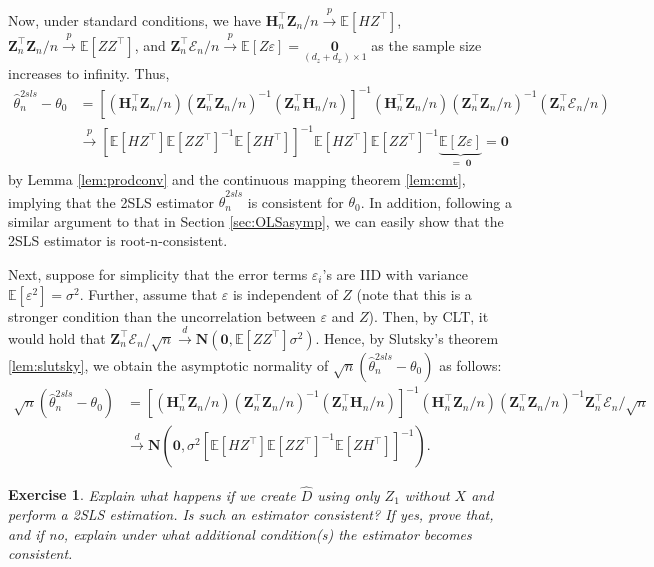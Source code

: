 \documentclass[10.5pt, A4paper, openany, uplatex]{book}
\newcommand{\mbf}{\mathbf}
\newcommand{\mcl}{\mathcal}
\newcommand{\eps}{\varepsilon}
\newcommand{\E}{\mathbb{E}}
\renewcommand{\hat}{\widehat}
\newtheorem{exercise}[theorem]{Exercise}
\numberwithin{equation}{section}
\begin{document}
Now, under standard conditions, we have $\mbf{H}_n^\top \mbf{Z}_n/n \overset{p}{\to} \E[H Z^\top]$,  $\mbf{Z}_n^\top \mbf{Z}_n/n \overset{p}{\to} \E[Z Z^\top]$, and  $\mbf{Z}_n^\top \mcl{E}_n/n \overset{p}{\to} \E[Z \eps] = \underset{(d_z + d_x)\times 1}{\mbf{0}}$ as the sample size increases to infinity.
Thus,
\begin{align*}	
	\hat\theta_n^{2sls} - \theta_0
	& = \left[(\mbf{H}_n^\top \mbf{Z}_n/n)(\mbf{Z}_n^\top \mbf{Z}_n/n)^{-1}(\mbf{Z}_n^\top \mbf{H}_n/n ) \right]^{-1}(\mbf{H}_n^\top \mbf{Z}_n/n)(\mbf{Z}_n^\top \mbf{Z}_n/n)^{-1}(\mbf{Z}_n^\top\mcl{E}_n/n) \\
	& \overset{p}{\to} \left[ \E[H Z^\top] \E[Z Z^\top]^{-1} \E[Z H^\top] \right]^{-1} \E[H Z^\top] \E[Z Z^\top]^{-1} \underbrace{\E[Z \eps]}_{= \; \mbf{0}} = \mbf{0}
\end{align*}
by Lemma \ref{lem:prodconv} and the continuous mapping theorem \ref{lem:cmt}, implying that the 2SLS estimator $\hat\theta_n^{2sls}$ is consistent for $\theta_0$.
In addition, following a similar argument to that in Section \ref{sec:OLSasymp}, we can easily show that the 2SLS estimator is root-n-consistent.

Next, suppose for simplicity that the error terms $\eps_i$'s are IID with variance $\E[\eps^2] = \sigma^2$.
Further, assume that $\eps$ is independent of $Z$ (note that this is a stronger condition than the uncorrelation between $\eps$ and $Z$).
Then, by CLT, it would hold that $\mbf{Z}_n^\top\mcl{E}_n/\sqrt{n} \overset{d}{\to} \mbf{N}(\mbf{0}, \E[Z Z^\top]\sigma^2)$.
Hence, by Slutsky's theorem \ref{lem:slutsky}, we obtain the asymptotic normality of $\sqrt{n}(\hat\theta_n^{2sls} - \theta_0)$ as follows:
\begin{align*}
	\sqrt{n}(\hat\theta_n^{2sls} - \theta_0) 
	& = \left[(\mbf{H}_n^\top \mbf{Z}_n/n)(\mbf{Z}_n^\top \mbf{Z}_n/n)^{-1}(\mbf{Z}_n^\top \mbf{H}_n/n ) \right]^{-1}(\mbf{H}_n^\top \mbf{Z}_n/n)(\mbf{Z}_n^\top \mbf{Z}_n/n)^{-1}\mbf{Z}_n^\top\mcl{E}_n/\sqrt{n} \\
	& \overset{d}{\to} \mbf{N}\left(\mbf{0}, \sigma^2  \left[ \E[H Z^\top] \E[Z Z^\top]^{-1} \E[Z H^\top] \right]^{-1}\right).
\end{align*}

\begin{framed}
\begin{exercise}\upshape
	Explain what happens if we create $\hat D$ using only $Z_1$ without $X$ and perform a 2SLS estimation.
	Is such an estimator consistent? If yes, prove that, and if no, explain under what additional condition(s) the estimator becomes consistent.
\end{exercise}
\end{framed}
\end{document}
